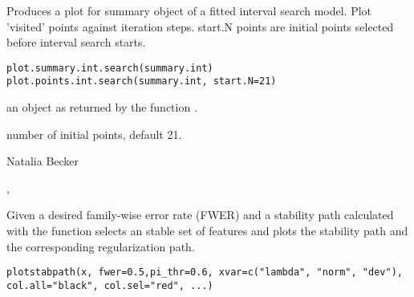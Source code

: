 \documentclass[letterpaper]{book}
\begin{document}
%
\begin{Description}\relax
Produces a plot for summary object of a fitted interval search model.
Plot 'visited' points against iteration steps. start.N points are initial points selected before interval search starts.
\end{Description}
%
\begin{Usage}
\begin{verbatim}
plot.summary.int.search(summary.int)
plot.points.int.search(summary.int, start.N=21)
\end{verbatim}
\end{Usage}
%
\begin{Arguments}
\begin{ldescription}
\item[\code{summary.int}] 
an object as returned by the function .

\item[\code{start.N}] 
number of initial points, default 21.

\end{ldescription}
\end{Arguments}
%
\begin{Author}\relax
Natalia Becker  \bsl{}
\end{Author}
%
\begin{SeeAlso}\relax
 , 
\end{SeeAlso}
%
\begin{Description}\relax
Given a desired family-wise error rate (FWER) and a stability path calculated with  the function selects an stable set of features and plots the stability path and the corresponding regularization path.
\end{Description}
%
\begin{Usage}
\begin{verbatim}
plotstabpath(x, fwer=0.5,pi_thr=0.6, xvar=c("lambda", "norm", "dev"), col.all="black", col.sel="red", ...)
\end{verbatim}
\end{Usage}
\end{document}
